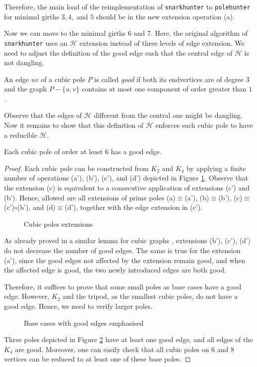 Therefore, the main load of the reimplementation of \texttt{snarkhunter} to \texttt{polehunter} for minimal girths $3, 4,$ and $5$ should be in the new extension operation (a).

Now we can move to the minimal girths $6$ and $7$. Here, the original algorithm of \texttt{snarkhunter} uses an $\mathcal H$ extension instead of three levels of edge extension. We need to adjust the definition of the good edge such that the central edge of $\mathcal H$ is not dangling.

\begin{definition}
    An edge $uv$ of a cubic pole $P$ is called \emph{good} if both its endvertices are of degree $3$ and the graph $P-\{u, v\}$ contains at most one component of order greater than $1$.
\end{definition}

Observe that the edges of $\mathcal H$ different from the central one might be dangling. Now it remains to show that this definition of $\mathcal H$ enforces each cubic pole to have a reducible $\mathcal H$.

\begin{lemma}
    Each cubic pole of order at least $6$ has a good edge.
\end{lemma}
\begin{proof}
    Each cubic pole can be constructed from $K_2$ and $K_4$ by applying a finite number of operations (a'), (b'), (c'), and (d') depicted in Figure \ref{fig:general_reductions_poles}. Observe that the extension (c) is equivalent to a consecutive application of extensions (c') and (b'). Hence, allowed are all extensions of prime poles (a)$\equiv$(a'), (b)$\equiv$(b'), (c)$\equiv$(c')$\circ$(b'), and (d)$\equiv$(d'), together with the edge extension in (c').
    \begin{figure}[h!]\centering
        
        \caption{Cubic poles extensions}
        \label{fig:general_reductions_poles}
    \end{figure}
    As already proved in a similar lemma for cubic graphs \cite[p. 263]{snarkhunter_better}, extensions (b'), (c'), (d') do not decrease the number of good edges. The same is true for the extension (a'), since the good edges not affected by the extension remain good, and when the affected edge is good, the two newly introduced edges are both good.
    
    Therefore, it suffices to prove that some small poles as base cases have a good edge. However, $K_2$ and the tripod, as the smallest cubic poles, do not have a good edge. Hence, we need to verify larger poles.
    \begin{figure}[h!]\centering
        
        \caption{Base cases with good edges emphasised}
        \label{fig:good_edges_base_cases}
    \end{figure}
    
    Three poles depicted in Figure \ref{fig:good_edges_base_cases} have at least one good edge, and all edges of the $K_4$ are good. Moreover, one can easily check that all cubic poles on $6$ and $8$ vertices can be reduced to at least one of these base poles. 
\end{proof}

